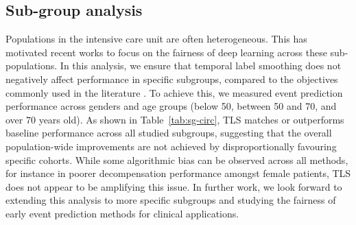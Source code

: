 \documentclass[nohyperref]{article}
\begin{document}
\subsection{Sub-group analysis}
Populations in the intensive care unit are often heterogeneous. This has motivated recent works to focus on the fairness of deep learning across these sub-populations. In this analysis, we ensure that temporal label smoothing does not negatively affect performance in specific subgroups, compared to the objectives commonly used in the literature \citep{tomavsev2019, hyland2020, Lauritsen2020}. To achieve this, we measured event prediction performance across genders and age groups (below 50, between 50 and 70, and over 70 years old). As shown in Table~\ref{tab:sg-circ}, TLS matches or outperforms baseline performance across all studied subgroups, suggesting that the overall population-wide improvements are not achieved by disproportionally favouring specific cohorts. While some algorithmic bias can be observed across all methods, for instance in poorer decompensation performance amongst female patients, TLS does not appear to be amplifying this issue. In further work, we look forward to extending this analysis to more specific subgroups and studying the fairness of early event prediction methods for clinical applications.
\end{document}
